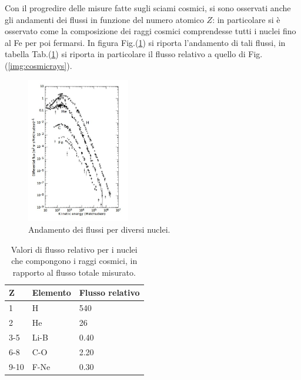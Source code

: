 Con il progredire delle misure fatte sugli sciami cosmici, si sono osservati anche gli andamenti dei flussi in funzione del numero atomico $Z$: in particolare si è osservato come la composizione dei raggi cosmici comprendesse tutti i nuclei fino al Fe per poi fermarsi. In figura Fig.(\ref{img:cosmicZ}) si riporta l'andamento di tali flussi, in tabella Tab.(\ref{tab:cosmicZ}) si riporta in particolare il flusso relativo a quello di Fig.(\ref{img:cosmicrays}).

\begin{figure}[H]
    \centering
    \includegraphics[width=0.4\textwidth]{img/cosmicrayZ.jpg}
    \caption{Andamento dei flussi per diversi nuclei.}  
    \label{img:cosmicZ}  
\end{figure}

\begin{table}[H]
    \centering
    \begin{tabular}{lll}
        \toprule
        \textbf{Z} & \textbf{Elemento} & \textbf{Flusso relativo} \\
        \midrule
        1          & H                 & 540                      \\
        2          & He                & 26                       \\
        3-5        & Li-B              & 0.40                     \\
        6-8        & C-O               & 2.20                     \\
        9-10       & F-Ne              & 0.30                     \\
        \bottomrule
    \end{tabular}
    \caption{Valori di flusso relativo per i nuclei che compongono i raggi cosmici, in rapporto al flusso totale misurato.}
    \label{tab:cosmicZ}
\end{table}

